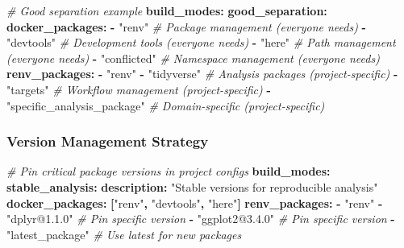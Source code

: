 \documentclass[
]{article}
\newenvironment{Shaded}{\begin{snugshade}}{\end{snugshade}}
\newcommand{\AttributeTok}[1]{\textcolor[rgb]{0.13,0.29,0.53}{#1}}
\newcommand{\CommentTok}[1]{\textcolor[rgb]{0.56,0.35,0.01}{\textit{#1}}}
\newcommand{\FunctionTok}[1]{\textcolor[rgb]{0.13,0.29,0.53}{\textbf{#1}}}
\newcommand{\KeywordTok}[1]{\textcolor[rgb]{0.13,0.29,0.53}{\textbf{#1}}}
\newcommand{\StringTok}[1]{\textcolor[rgb]{0.31,0.60,0.02}{#1}}
\begin{document}
\begin{Shaded}
\begin{Highlighting}[]
\CommentTok{\# Good separation example}
\FunctionTok{build\_modes}\KeywordTok{:}
\AttributeTok{  }\FunctionTok{good\_separation}\KeywordTok{:}
\AttributeTok{    }\FunctionTok{docker\_packages}\KeywordTok{:}
\AttributeTok{      }\KeywordTok{{-}}\AttributeTok{ }\StringTok{"renv"}\CommentTok{          \# Package management (everyone needs)}
\AttributeTok{      }\KeywordTok{{-}}\AttributeTok{ }\StringTok{"devtools"}\CommentTok{      \# Development tools (everyone needs)}
\AttributeTok{      }\KeywordTok{{-}}\AttributeTok{ }\StringTok{"here"}\CommentTok{          \# Path management (everyone needs)}
\AttributeTok{      }\KeywordTok{{-}}\AttributeTok{ }\StringTok{"conflicted"}\CommentTok{    \# Namespace management (everyone needs)}
\AttributeTok{    }\FunctionTok{renv\_packages}\KeywordTok{:}
\AttributeTok{      }\KeywordTok{{-}}\AttributeTok{ }\StringTok{"renv"}
\AttributeTok{      }\KeywordTok{{-}}\AttributeTok{ }\StringTok{"tidyverse"}\CommentTok{     \# Analysis packages (project{-}specific)}
\AttributeTok{      }\KeywordTok{{-}}\AttributeTok{ }\StringTok{"targets"}\CommentTok{       \# Workflow management (project{-}specific)}
\AttributeTok{      }\KeywordTok{{-}}\AttributeTok{ }\StringTok{"specific\_analysis\_package"}\CommentTok{  \# Domain{-}specific (project{-}specific)}
\end{Highlighting}
\end{Shaded}

\subsubsection{Version Management
Strategy}\label{version-management-strategy}

\begin{Shaded}
\begin{Highlighting}[]
\CommentTok{\# Pin critical package versions in project configs}
\FunctionTok{build\_modes}\KeywordTok{:}
\AttributeTok{  }\FunctionTok{stable\_analysis}\KeywordTok{:}
\AttributeTok{    }\FunctionTok{description}\KeywordTok{:}\AttributeTok{ }\StringTok{"Stable versions for reproducible analysis"}
\AttributeTok{    }\FunctionTok{docker\_packages}\KeywordTok{:}\AttributeTok{ }\KeywordTok{[}\StringTok{"renv"}\KeywordTok{,}\AttributeTok{ }\StringTok{"devtools"}\KeywordTok{,}\AttributeTok{ }\StringTok{"here"}\KeywordTok{]}
\AttributeTok{    }\FunctionTok{renv\_packages}\KeywordTok{:}
\AttributeTok{      }\KeywordTok{{-}}\AttributeTok{ }\StringTok{"renv"}
\AttributeTok{      }\KeywordTok{{-}}\AttributeTok{ }\StringTok{"dplyr@1.1.0"}\CommentTok{        \# Pin specific version}
\AttributeTok{      }\KeywordTok{{-}}\AttributeTok{ }\StringTok{"ggplot2@3.4.0"}\CommentTok{      \# Pin specific version}
\AttributeTok{      }\KeywordTok{{-}}\AttributeTok{ }\StringTok{"latest\_package"}\CommentTok{     \# Use latest for new packages}
\end{Highlighting}
\end{Shaded}
\end{document}
